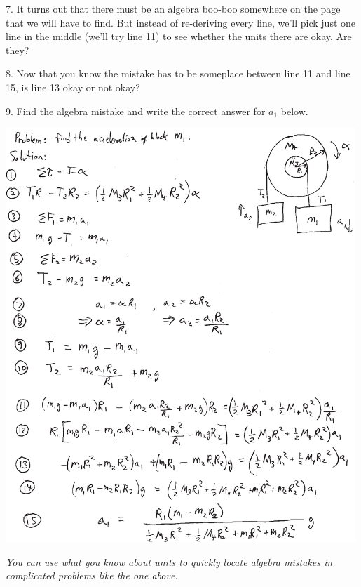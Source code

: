 7. It turns out that there must be an algebra boo-boo somewhere on the page that we will have to find.  But instead of re-deriving every line, we'll pick just one line in the middle (we'll try line 11) to see whether the units there are okay.  Are they?
\vspace{0.4in}

8. Now that you know the mistake has to be someplace between line 11 and line 15, is line 13 okay or not okay?
\vspace{0.2in}

9. Find the algebra mistake and write the correct answer for $a_1$ below.
\vspace{0.5in}

\newpage

\begin{center}
\includegraphics[width=0.99\textwidth]{check_your_units/find_the_error_using_units2.eps}
\end{center}

\textit{You can use what you know about units to quickly locate algebra mistakes in complicated problems like the one above.}



